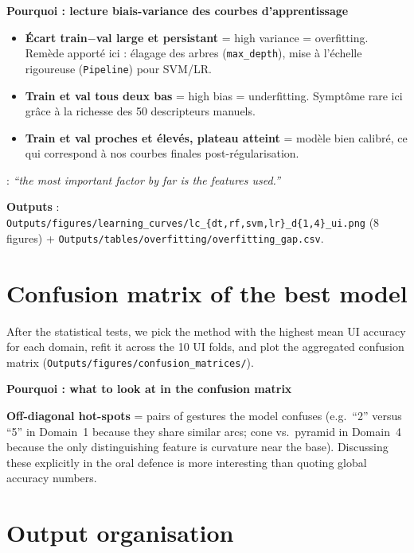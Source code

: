 \documentclass[11pt,a4paper]{article}
\newenvironment{whybox}[1]{%
    \begin{shaded*}\noindent\textbf{Pourquoi : #1}\par\vspace{0.3em}}
    {\end{shaded*}}
\renewenvironment{shaded*}
    {\definecolor{shadecolor}{named}{whyboxbg}\begin{shaded}}
    {\end{shaded}}
\begin{document}
\begin{whybox}{lecture biais-variance des courbes d'apprentissage}
\begin{itemize}[itemsep=0.1em,topsep=0.2em]
\item \textbf{Écart train$-$val large et persistant} = high variance =
      overfitting. Remède apporté ici : élagage des arbres (\texttt{max\_depth}),
      mise à l'échelle rigoureuse (\texttt{Pipeline}) pour SVM/LR.
\item \textbf{Train et val tous deux bas} = high bias = underfitting.
      Symptôme rare ici grâce à la richesse des 50 descripteurs manuels.
\item \textbf{Train et val proches et élevés, plateau atteint} =
      modèle bien calibré, ce qui correspond à nos courbes finales post-régularisation.
\end{itemize}
\cite{domingos2012few} : \emph{``the most important factor by far is
the features used.''} 
\end{whybox}

\textbf{Outputs} : \texttt{Outputs/figures/learning\_curves/lc\_\{dt,rf,svm,lr\}\_d\{1,4\}\_ui.png}
(8 figures) + \texttt{Outputs/tables/overfitting/overfitting\_gap.csv}.


\section{Confusion matrix of the best model}

After the statistical tests, we pick the method with the highest mean
UI accuracy for each domain, refit it across the 10 UI folds, and plot
the aggregated confusion matrix
(\texttt{Outputs/figures/confusion\_matrices/}).

\begin{whybox}{what to look at in the confusion matrix}
\textbf{Off-diagonal hot-spots} = pairs of gestures the model
confuses (e.g.\ ``2'' versus ``5'' in Domain~1 because they share
similar arcs; cone vs.\ pyramid in Domain~4 because the only
distinguishing feature is curvature near the base). Discussing
these explicitly in the oral defence is more interesting than
quoting global accuracy numbers.
\end{whybox}

\section{Output organisation}\label{sec:outputs}
\end{document}
